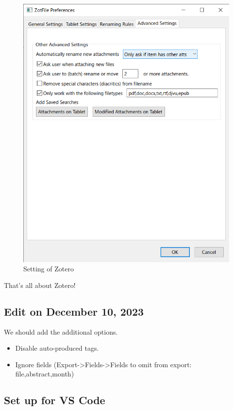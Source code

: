 \documentclass[a4paper,pdftex]{article}
\begin{document}
\begin{figure}[ht]
\begin{minipage}[ht]{0.19\columnwidth}
    \includegraphics[width=\columnwidth]{fig/zotero15.png}
  \end{minipage}
  \caption{Setting of Zotero}
  \label{setting_zotero}
\end{figure}

That's all about Zotero!


\subsection*{Edit on December 10, 2023}

We should add the additional options.

\begin{itemize}
  \item 
  Disable auto-produced tags.
  \item 
  Ignore fields (Export->Fields->Fields to omit from export: file,abstract,month)
\end{itemize}


\subsection{Set up for VS Code}
\end{document}
